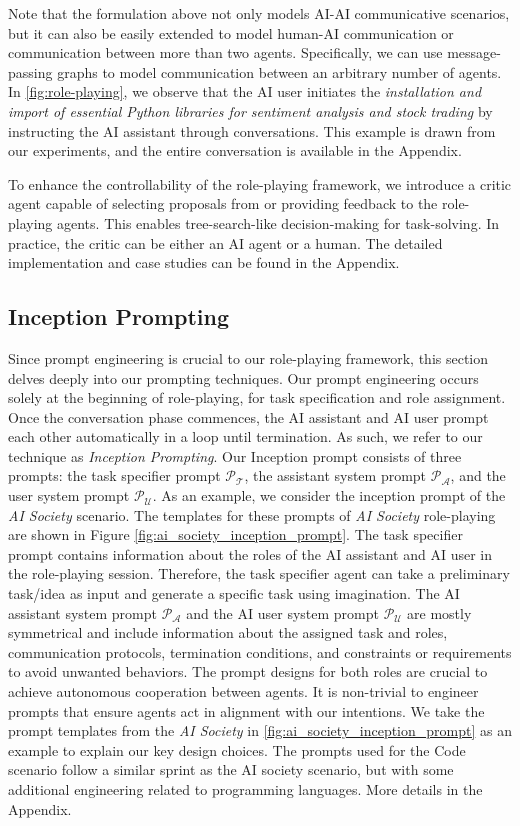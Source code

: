Note that the formulation above not only models AI-AI communicative scenarios, but it can also be easily extended to model human-AI communication or communication between more than two agents. Specifically, we can use message-passing graphs to model communication between an arbitrary number of agents. In \figLabel \ref{fig:role-playing}, we observe that the AI user initiates the \textit{installation and import of essential Python libraries for sentiment analysis and stock trading} by instructing the AI assistant through conversations. This example is drawn from our experiments, and the entire conversation is available in the Appendix.

 To enhance the controllability of the role-playing framework, we introduce a critic agent capable of selecting proposals from or providing feedback to the role-playing agents. This enables tree-search-like decision-making for task-solving. In practice, the critic can be either an AI agent or a human. The detailed implementation and case studies can be found in the Appendix.


\subsection{Inception Prompting} \label{subsec:inception_prompting}
Since prompt engineering is crucial to our role-playing framework, this section delves deeply into our prompting techniques. 
Our prompt engineering occurs solely at the beginning of role-playing, for task specification and role assignment. Once the conversation phase commences, the AI assistant and AI user prompt each other automatically in a loop until termination. As such, we refer to our technique as \textit{Inception Prompting}. Our Inception prompt consists of three prompts: the task specifier prompt $\mathcal{P}_{\mathcal{T}}$, the assistant system prompt $\mathcal{P}_{\mathcal{A}}$, and the user system prompt $\mathcal{P}_{\mathcal{U}}$. As an example, we consider the inception prompt of the \textit{AI Society} scenario. The templates for these prompts of \textit{AI Society} role-playing are shown in Figure \ref{fig:ai_society_inception_prompt}. The task specifier prompt contains information about the roles of the AI assistant and AI user in the role-playing session. Therefore, the task specifier agent can take a preliminary task/idea as input and generate a specific task using imagination. The AI assistant system prompt $\mathcal{P}_{\mathcal{A}}$ and the AI user system prompt $\mathcal{P}_{\mathcal{U}}$ are mostly symmetrical and include information about the assigned task and roles, communication protocols, termination conditions, and constraints or requirements to avoid unwanted behaviors. The prompt designs for both roles are crucial to achieve autonomous cooperation between agents. It is non-trivial to engineer prompts that ensure agents act in alignment with our intentions. We take the prompt templates from the \textit{AI Society} in \figLabel \ref{fig:ai_society_inception_prompt} as an example to explain our key design choices. The prompts used for the Code scenario follow a similar sprint as the AI society scenario, but with some additional engineering related to programming languages. More details in the Appendix.


